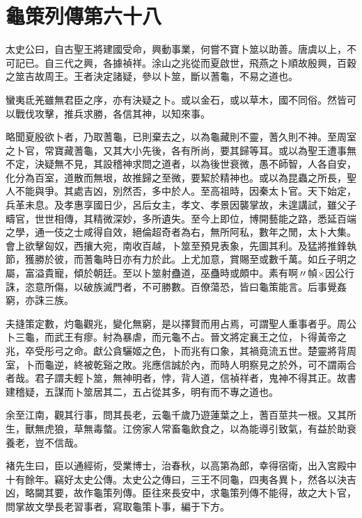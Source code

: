 \chapter{龜策列傳第六十八}

太史公曰，自古聖王將建國受命，興動事業，何嘗不寶卜筮以助善。唐虞以上，不可記已。自三代之興，各據禎祥。涂山之兆從而夏啟世，飛燕之卜順故殷興，百穀之筮吉故周王。王者決定諸疑，參以卜筮，斷以蓍龜，不易之道也。

蠻夷氐羌雖無君臣之序，亦有決疑之卜。或以金石，或以草木，國不同俗。然皆可以戰伐攻擊，推兵求勝，各信其神，以知來事。

略聞夏殷欲卜者，乃取蓍龜，已則棄去之，以為龜藏則不靈，蓍久則不神。至周室之卜官，常寶藏蓍龜，又其大小先後，各有所尚，要其歸等耳。或以為聖王遭事無不定，決疑無不見，其設稽神求問之道者，以為後世衰微，愚不師智，人各自安，化分為百室，道散而無垠，故推歸之至微，要絜於精神也。或以為昆蟲之所長，聖人不能與爭。其處吉凶，別然否，多中於人。至高祖時，因秦太卜官。天下始定，兵革未息。及孝惠享國日少，呂后女主，孝文、孝景因襲掌故，未遑講試，雖父子疇官，世世相傳，其精微深妙，多所遺失。至今上即位，博開藝能之路，悉延百端之學，通一伎之士咸得自效，絕倫超奇者為右，無所阿私，數年之閒，太卜大集。會上欲擊匈奴，西攘大宛，南收百越，卜筮至預見表象，先圖其利。及猛將推鋒執節，獲勝於彼，而蓍龜時日亦有力於此。上尤加意，賞賜至或數千萬。如丘子明之屬，富溢貴寵，傾於朝廷。至以卜筮射蠱道，巫蠱時或頗中。素有啊〃幀×因公行誅，恣意所傷，以破族滅門者，不可勝數。百僚蕩恐，皆曰龜策能言。后事覺姦窮，亦誅三族。

夫摓策定數，灼龜觀兆，變化無窮，是以擇賢而用占焉，可謂聖人重事者乎。周公卜三龜，而武王有瘳。紂為暴虐，而元龜不占。晉文將定襄王之位，卜得黃帝之兆，卒受彤弓之命。獻公貪驪姬之色，卜而兆有口象，其禍竟流五世。楚靈將背周室，卜而龜逆，終被乾谿之敗。兆應信誠於內，而時人明察見之於外，可不謂兩合者哉。君子謂夫輕卜筮，無神明者，悖，背人道，信禎祥者，鬼神不得其正。故書建稽疑，五謀而卜筮居其二，五占從其多，明有而不專之道也。

余至江南，觀其行事，問其長老，云龜千歲乃遊蓮葉之上，蓍百莖共一根。又其所生，獸無虎狼，草無毒螫。江傍家人常畜龜飲食之，以為能導引致氣，有益於助衰養老，豈不信哉。

褚先生曰，臣以通經術，受業博士，治春秋，以高第為郎，幸得宿衛，出入宮殿中十有餘年。竊好太史公傳。太史公之傳曰，三王不同龜，四夷各異卜，然各以決吉凶，略闚其要，故作龜策列傳。臣往來長安中，求龜策列傳不能得，故之大卜官，問掌故文學長老習事者，寫取龜策卜事，編于下方。

